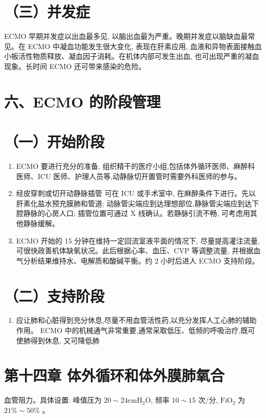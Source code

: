 \documentclass[10pt]{article}
\begin{document}
\section*{（三）并发症}
ECMO 早期并发症以出血最多见, 以脑出血最为严重。晚期并发症以脑缺血最常见。在 ECMO 中凝血功能发生很大变化, 表现在肝素应用, 血液和异物表面接触血小板活性物质释放、凝血因子消耗。在机体内部可发生出血, 也可出现严重的凝血现象。长时间 ECMO 还可带来感染的危险。

\section*{六、ECMO 的阶段管理}
\section*{（一）开始阶段}
\begin{enumerate}
  \item ECMO 要进行充分的准备, 组织精干的医疗小组,包括体外循环医师、麻醉科医师、ICU 医师、护理人员等,动静脉切开置管时需要外科医师的参与。

  \item 经皮穿刺或切开动静脉插管 可在 ICU 或手术室中, 在麻醉条件下进行。先以肝素化盐水预充膜肺和管道; 动脉管尖端应到达理想部位,静脉管尖端应到达下腔静脉的心房人口; 插管位置可通过 X 线确认。若静脉引流不畅, 可考虑用其他静脉缓解。

  \item ECMO 开始的 15 分钟在维持一定回流室液平面的情况下, 尽量提高灌注流量, 可很快政善机体缺氧状况。此后根据心率、血压、CVP 等调整流量, 并根据血气分析结果维持水、电解质和酸碱平衡。约 2 小时后进人 ECMO 支持阶段。

\end{enumerate}

\section*{（二）支持阶段}
\begin{enumerate}
  \item 应让肺和心脏得到充分休息,尽量不用血管活性药,以充分发挥人工心肺的辅助作用。 ECMO 中的机械通气非常重要,通常采取低压、低频的呼吸治疗,既可使肺得到休息, 又可降低肺
\end{enumerate}

\section*{第十四章 体外循环和体外膜肺氧合}
血管阻力。具体设置: 峰值压为 $20 \sim 24 \mathrm{cmH}_{2} \mathrm{O}$, 频率 $10 \sim 15$ 次/分, $\mathrm{FiO}_{2}$ 为 $21 \% \sim 50 \%$ 。
\end{document}
